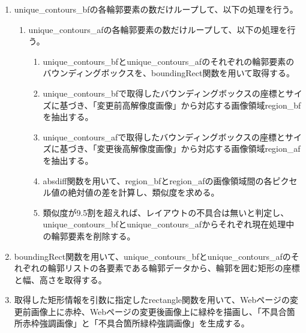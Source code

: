 \begin{enumerate}
    \item unique\_contours\_bfの各輪郭要素の数だけループして、以下の処理を行う。
          \begin{enumerate}
              \item unique\_contours\_afの各輪郭要素の数だけループして、以下の処理を行う。
                    \begin{enumerate}
                        \item unique\_contours\_bfとunique\_contours\_afのそれぞれの輪郭要素のバウンディングボックスを、boundingRect関数を用いて取得する。
                        \item unique\_contours\_bfで取得したバウンディングボックスの座標とサイズに基づき、「変更前高解像度画像」から対応する画像領域region\_bfを抽出する。
                        \item unique\_contours\_afで取得したバウンディングボックスの座標とサイズに基づき、「変更後高解像度画像」から対応する画像領域region\_afを抽出する。
                        \item absdiff関数を用いて、region\_bfとregion\_afの画像領域間の各ピクセル値の絶対値の差を計算し、類似度を求める。
                        \item 類似度が9.5割を超えれば、レイアウトの不具合は無いと判定し、unique\_contours\_bfとunique\_contours\_afからそれぞれ現在処理中の輪郭要素を削除する。
                    \end{enumerate}
          \end{enumerate}
    \item boundingRect関数を用いて、unique\_contours\_bfとunique\_contours\_afのそれぞれの輪郭リストの各要素である輪郭データから、輪郭を囲む矩形の座標と幅、高さを取得する。
    \item 取得した矩形情報を引数に指定したrectangle関数を用いて、Webページの変更前画像上に赤枠、Webページの変更後画像上に緑枠を描画し、「不具合箇所赤枠強調画像」と「不具合箇所緑枠強調画像」を生成する。
\end{enumerate}


